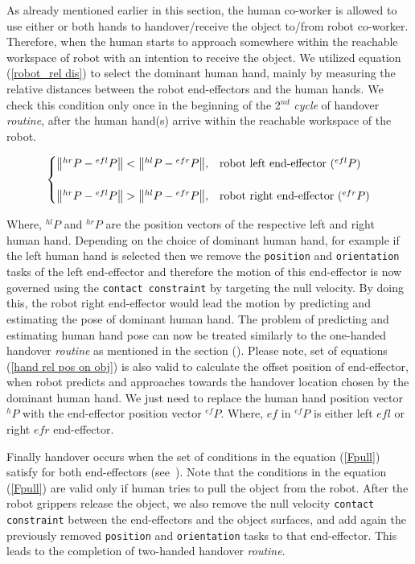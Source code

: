 As already mentioned earlier in this section, the human co-worker is allowed to use either or both hands to handover/receive the object to/from robot co-worker. Therefore, when the human starts to approach somewhere within the reachable workspace of robot with an intention to receive the object. We utilized equation (\ref{robot_rel dis}) to select the dominant human hand, mainly by measuring the relative distances between the robot end-effectors and the human hands. We check this condition only once in the beginning of the 2$^{nd}$ \textit{cycle} of handover \textit{routine}, after the human hand(s) arrive within the reachable workspace of the robot.

\begin{equation}\label{robot_rel dis}
\centering
\begin{cases}
\norm{{}^{hr}{P} - {}^{efl}{P}} < \norm{{}^{hl}{P} - {}^{efr}{P}}, &  \text{robot left end-effector (${}^{efl}{P}$)} \\
\\
\norm{{}^{hr}{P} - {}^{efl}{P}} > \norm{{}^{hl}{P} - {}^{efr}{P}}, &  \text{robot right end-effector (${}^{efr}{P}$)} \\
\end{cases}
\end{equation}

Where, ${}^{hl}{P}$ and ${}^{hr}{P}$ are the position vectors of the respective left and right human hand. Depending on the choice of dominant human hand, for example if the left human hand is selected then we remove the \texttt{position} and \texttt{orientation} tasks of the left end-effector and therefore the motion of this end-effector is now governed using the \texttt{contact constraint} by targeting the null velocity. By doing this, the robot right end-effector would lead the motion by predicting and estimating the pose of dominant human hand. The problem of predicting and estimating human hand pose can now be treated similarly to the one-handed handover \textit{routine} as mentioned in the section (). Please note, set of equations (\ref{hand rel pos on obj}) is also valid to calculate the offset position of end-effector, when robot predicts and approaches towards the handover location chosen by the dominant human hand. We just need to replace the human hand position vector ${}^{h}{P}$ with the end-effector position vector ${}^{ef}{P}$. Where, $ef$ in ${}^{ef}{P}$ is either left $efl$ or right $efr$ end-effector.


Finally handover occurs when the set of conditions in the equation (\ref{Fpull}) satisfy for both end-effectors (see~). Note that the conditions in the equation (\ref{Fpull}) are valid only if human tries to pull the object from the robot. After the robot grippers release the object, we also remove the null velocity \texttt{contact constraint} between the end-effectors and the object surfaces, and add again the previously removed \texttt{position} and \texttt{orientation} tasks to that end-effector. This leads to the completion of two-handed handover \textit{routine}. 

